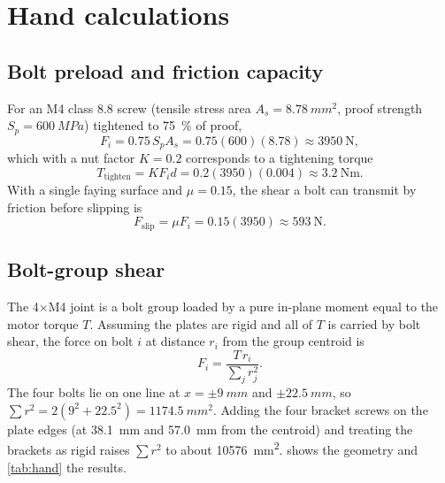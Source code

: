 \documentclass[11pt,letterpaper]{article}
\begin{document}
\section{Hand calculations}
\subsection{Bolt preload and friction capacity}
For an M4 class 8.8 screw (tensile stress area $A_s=\SI{8.78}{mm^2}$, proof strength
$S_p=\SI{600}{MPa}$) tightened to \SI{75}{\percent} of proof,
\begin{equation}
  F_i = 0.75\,S_p A_s = 0.75(600)(8.78) \approx \SI{3950}{\newton},
\end{equation}
which with a nut factor $K=0.2$ corresponds to a tightening torque
\begin{equation}
  T_{\text{tighten}} = K F_i d = 0.2(3950)(0.004) \approx \SI{3.2}{\newton\metre}.
\end{equation}
With a single faying surface and $\mu=0.15$, the shear a bolt can transmit by friction
before slipping is
\begin{equation}
  F_{\text{slip}} = \mu F_i = 0.15(3950) \approx \SI{593}{\newton}.
\end{equation}

\subsection{Bolt-group shear}
The 4$\times$M4 joint is a bolt group loaded by a pure in-plane moment equal to the motor
torque $T$. Assuming the plates are rigid and all of $T$ is carried by bolt shear, the
force on bolt $i$ at distance $r_i$ from the group centroid is
\begin{equation}
  F_i = \frac{T\,r_i}{\sum_j r_j^2}.
  \label{eq:boltgroup}
\end{equation}
The four bolts lie on one line at $x=\pm\SI{9}{mm}$ and $\pm\SI{22.5}{mm}$, so
$\sum r^2 = 2(9^2+22.5^2)=\SI{1174.5}{mm^2}$. Adding the four bracket screws on the plate
edges (at \SI{38.1}{mm} and \SI{57.0}{mm} from the centroid) and treating the brackets as
rigid raises $\sum r^2$ to about \SI{10576}{mm^2}.  shows the
geometry and \cref{tab:hand} the results.
\end{document}
